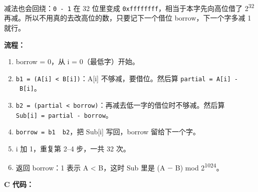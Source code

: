 \documentclass[11pt,a4paper]{ctexart}
\providecommand{\tightlist}{\setlength{\itemsep}{0pt}\setlength{\parskip}{0pt}}
\begin{document}
减法也会回绕：\texttt{0\ -\ 1} 在 32 位里变成
\texttt{0xffffffff}，相当于本字先向高位借了 2\textsuperscript{32}
再减。所以不用真的去改高位的数，只要记下一个借位 borrow，下一个字多减 1
就行。


\textbf{流程：}

\begin{enumerate}
\def\labelenumi{\arabic{enumi}.}
\tightlist
\item
  borrow = 0，从 i = 0（最低字）开始。
\item
  \texttt{b1\ =\ (A{[}i{]}\ \textless{}\ B{[}i{]})}：A{[}i{]}
  不够减，要借位。然后算 \texttt{partial\ =\ A{[}i{]}\ -\ B{[}i{]}}。
\item
  \texttt{b2\ =\ (partial\ \textless{}\ borrow)}：再减去低一字的借位时不够减。然后算
  \texttt{Sub{[}i{]}\ =\ partial\ -\ borrow}。
\item
  \texttt{borrow\ =\ b1\ \textbar{}\ b2}，把 Sub{[}i{]} 写回，borrow
  留给下一个字。
\item
  i 加 1，重复第 2--4 步，一共 32 次。
\item
  返回 borrow：1 表示 A \textless{} B，这时 Sub 里是 (A \ensuremath{-}
  B) mod 2\textsuperscript{1024}。
\end{enumerate}


\textbf{C 代码：}
\end{document}
